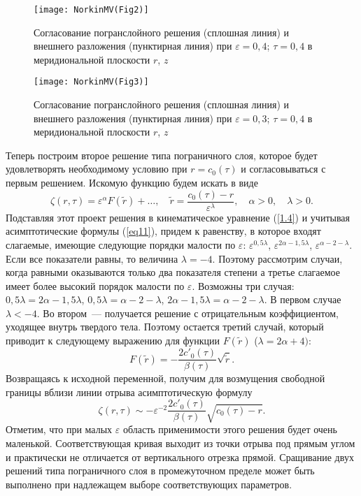 \documentclass[press]{vestnik}
\begin{document}
\begin{figure}
\centering
\texttt{[image: NorkinMV(Fig2)]}
\caption{Согласование погранслойного решения (сплошная линия) и внешнего 
разложения (пунктирная линия) при $\varepsilon =0,4$; $\tau =0,4$ в 
меридиональной плоскости $r$, $z$}
\label{fig2}
\end{figure}

\begin{figure}
\centering
\texttt{[image: NorkinMV(Fig3)]}
\caption{Согласование погранслойного решения (сплошная линия) и внешнего 
разложения (пунктирная линия) при $\varepsilon =0,3$; $\tau =0,4$ в 
меридиональной плоскости $r$, $z$}
\label{fig3}
\end{figure}

Теперь построим второе решение типа пограничного слоя, которое будет 
удовлетворять необходимому условию при $r=c_{0} (\tau )$ и согласовываться с 
первым решением. Искомую функцию будем искать в виде
\[
\zeta (r,\tau )=\varepsilon^{\alpha }F(\tilde{{r}})+\ldots,
\quad
\tilde{{r}}=\frac{c_{0} (\tau )-r}{\varepsilon^{\lambda }},
\quad
\alpha >0, \quad \lambda >0.
\]
Подставляя этот проект решения в кинематическое уравнение (\ref{1.4}) и учитывая 
асимптотические формулы (\ref{eq11}), придем к равенству, в которое входят 
слагаемые, имеющие следующие порядки малости по $\varepsilon $: $\varepsilon 
^{0,5\lambda }$, $\varepsilon^{2\alpha -1,5\lambda }$, $\varepsilon 
^{\alpha -2-\lambda }$. Если все показатели равны, то величина $\lambda =-4$. 
Поэтому рассмотрим случаи, когда равными оказываются только два показателя 
степени а третье слагаемое имеет более высокий порядок малости по 
$\varepsilon $. Возможны три случая: $0,5\lambda =2\alpha -1,5\lambda $, 
$0,5\lambda =\alpha -2-\lambda $, $2\alpha -1,5\lambda =\alpha -2-\lambda $. 
В первом случае $\lambda <-4$. Во втором~--- получается решение с отрицательным 
коэффициентом, уходящее внутрь твердого тела. Поэтому остается третий 
случай, который приводит к следующему выражению для функции $F(\tilde{{r}})$ 
($\lambda =2\alpha +4)$:
\[
F(\tilde{{r}})=-\frac{2{c}'_{0} (\tau )}{\beta (\tau )}\sqrt {\tilde{{r}}} .
\]
Возвращаясь к исходной переменной, получим для возмущения свободной границы 
вблизи линии отрыва асимптотическую формулу
\[
\zeta (r,\tau )\sim -\varepsilon^{-2}\frac{2{c}'_{0} (\tau )}{\beta (\tau 
)}\sqrt {c_{0} (\tau )-r} .
\]
Отметим, что при малых $\varepsilon $ область применимости этого решения 
будет очень маленькой. Соответствующая кривая выходит из точки отрыва под 
прямым углом и практически не отличается от вертикального отрезка прямой. 
Сращивание двух решений типа пограничного слоя в промежуточном пределе может 
быть выполнено при надлежащем выборе соответствующих параметров. 
\end{document}
